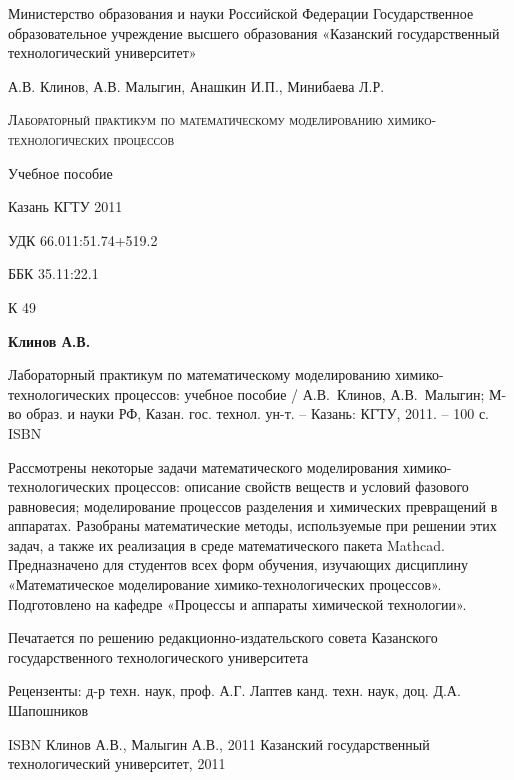 Министерство образования и науки Российской Федерации
Государственное образовательное учреждение
высшего образования
«Казанский государственный технологический университет»








А.В. Клинов, А.В. Малыгин, Анашкин И.П., Минибаева Л.Р.


\textsc{Лабораторный практикум по математическому моделированию химико-технологических процессов}


Учебное пособие














Казань
КГТУ
2011
\newpage

УДК 66.011:51.74+519.2

ББК 35.11:22.1

К 49

\textbf{Клинов А.В.}

Лабораторный практикум по математическому моделированию химико-технологических процессов: учебное пособие / А.В. Клинов, А.В. Малыгин; М-во образ. и науки РФ, Казан. гос. технол. ун-т. – Казань: КГТУ, 2011. – 100 с.
ISBN



Рассмотрены некоторые задачи математического моделирования химико-технологических процессов: описание свойств веществ и условий фазового равновесия; моделирование процессов разделения и химических превращений в аппаратах. Разобраны математические методы, используемые при решении этих задач, а также их реализация в среде математического пакета Mathcad. 
Предназначено для студентов всех форм обучения, изучающих дисциплину «Математическое моделирование химико-технологических процессов».
Подготовлено на кафедре «Процессы и аппараты химической технологии».

Печатается по решению редакционно-издательского совета Казанского государственного технологического университета





Рецензенты: д-р техн. наук, проф. А.Г. Лаптев
	         канд. техн. наук, доц. Д.А. Шапошников

ISBN 				 Клинов А.В., Малыгин А.В., 2011
				 Казанский государственный
технологический университет, 2011

\newpage
\tableofcontents
\newpage